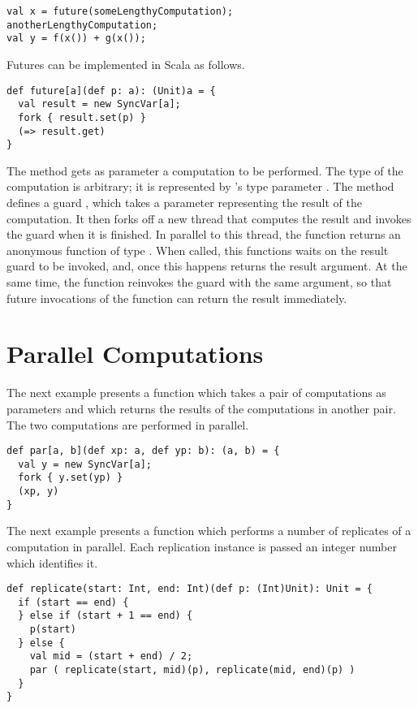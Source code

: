 \documentclass[11pt]{report}
\begin{document}
\begin{verbatim}
val x = future(someLengthyComputation);
anotherLengthyComputation;
val y = f(x()) + g(x());
\end{verbatim}

Futures can be implemented in Scala as follows.

\begin{verbatim}
def future[a](def p: a): (Unit)a = {
  val result = new SyncVar[a];
  fork { result.set(p) }
  (=> result.get)
}
\end{verbatim}

The \verb@future@ method gets as parameter a computation \verb@p@ to
be performed. The type of the computation is arbitrary; it is
represented by \verb@future@'s type parameter \verb@a@.  The
\verb@future@ method defines a guard \verb@result@, which takes a
parameter representing the result of the computation. It then forks
off a new thread that computes the result and invokes the
\verb@result@ guard when it is finished. In parallel to this thread,
the function returns an anonymous function of type \verb@a@.
When called, this functions waits on the result guard to be
invoked, and, once this happens returns the result argument.
At the same time, the function reinvokes the \verb@result@ guard with
the same argument, so that future invocations of the function can
return the result immediately.

\section{Parallel Computations}

The next example presents a function \verb@par@ which takes a pair of
computations as parameters and which returns the results of the computations
in another pair. The two computations are performed in parallel.

\begin{verbatim}
def par[a, b](def xp: a, def yp: b): (a, b) = {
  val y = new SyncVar[a];
  fork { y.set(yp) }
  (xp, y)
}
\end{verbatim}

The next example presents a function \verb@replicate@ which performs a
number of replicates of a computation in parallel. Each
replication instance is passed an integer number which identifies it.

\begin{verbatim}
def replicate(start: Int, end: Int)(def p: (Int)Unit): Unit = {
  if (start == end) {
  } else if (start + 1 == end) {
    p(start)
  } else {
    val mid = (start + end) / 2;
    par ( replicate(start, mid)(p), replicate(mid, end)(p) )
  }
}
\end{verbatim}
\end{document}
